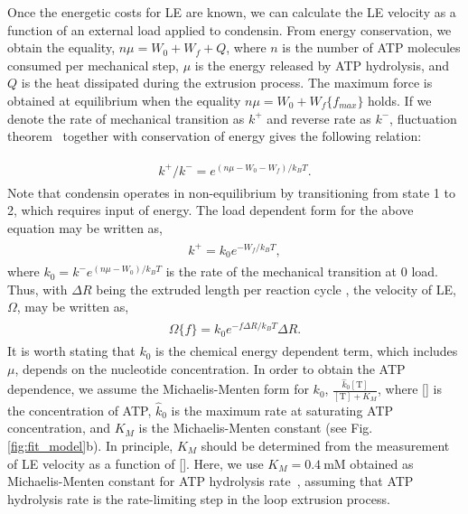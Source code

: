 \documentclass[fleqn,10pt]{wlscirep}
\newcommand{\mMol}{\mathrm{mM}}
\newcommand{\DR}{\Delta {R}}
\begin{document}
Once the energetic costs for LE are known, we can calculate the LE velocity as a function of an external load applied to condensin. From energy conservation, we obtain the equality, $n \mu=W_{0} + W_{f} + Q$, where $n$ is the number of ATP molecules consumed per mechanical step, $\mu$ is the energy released by ATP hydrolysis, and $Q$ is the heat dissipated during the extrusion process.  The maximum  force is obtained at equilibrium when the equality $n \mu = W_{0} +  W_{f}\{ f_  {max} \}$ holds.  If we denote the rate of mechanical transition as $k^+$ and reverse rate as $k^-$, fluctuation theorem~\cite{seifert2005fluctuation,seifert2012stochastic,mugnai2020theoretical} together with conservation of energy gives the following relation:  

\begin{align} 
\begin{split}
\label{eq:thermo}
k^{+}/k^{-} = e^{(n \mu-W_{0} - W_{f})/k_BT}. 
\end{split} 
\end{align}
Note that condensin operates in non-equilibrium by transitioning from state 1 to 2, which requires input of energy. The load dependent form for the above equation may be written as,
\begin{align} 
\begin{split}
\label{}
k^{+}= k_0 e^{-W_{f}/k_BT},
\end{split} 
\end{align}
where $k_0=k^{-} e^{(n \mu-W_{0})/k_BT}$ is the rate of the mechanical transition at $0$ load. 
Thus, with  $\DR$ being the extruded length per reaction cycle , the velocity  of LE, $\Omega$, may be written as, 
\begin{align} 
\begin{split}
\label{eq:omega}
\Omega\{f\}= k_0 e^{-f \DR / k_BT}\DR.
\end{split} 
\end{align}
It is worth stating that $k_0$ is the chemical energy dependent term, which includes $\mu$, depends on the nucleotide concentration. In order to obtain the ATP dependence, we assume the Michaelis-Menten form for $k_0$, $\frac{\hat{k}_0[\text{T}]}{[\text{T}]+K_M}$, where [] is the concentration of ATP, $\hat{k}_0$ is the maximum rate at saturating ATP concentration, and $K_M$ is the Michaelis-Menten constant (see Fig.\ref{fig:fit_model}b). In principle, $K_M$ should be determined from the measurement of LE velocity as a function of  []. Here, we use $K_M=0.4\ \mMol$ obtained as Michaelis-Menten constant for ATP hydrolysis rate~\cite{terakawa2017condensin}, assuming that ATP hydrolysis rate is the rate-limiting step in the loop extrusion process.
\end{document}
